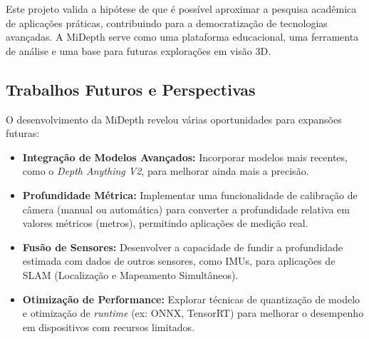 \documentclass{SBCbookchapter}
\newcommand{\nomeProjeto}{MiDepth }
\begin{document}
    Este projeto valida a hipótese de que é possível aproximar a pesquisa acadêmica de aplicações práticas, contribuindo para a democratização de tecnologias avançadas. A \nomeProjeto serve como uma plataforma educacional, uma ferramenta de análise e uma base para futuras explorações em visão 3D.

    \subsection{Trabalhos Futuros e Perspectivas}
    O desenvolvimento da \nomeProjeto revelou várias oportunidades para expansões futuras:
    \begin{itemize}
        \item \textbf{Integração de Modelos Avançados:} Incorporar modelos mais recentes, como o \textit{Depth Anything V2}, para melhorar ainda mais a precisão.
        \item \textbf{Profundidade Métrica:} Implementar uma funcionalidade de calibração de câmera (manual ou automática) para converter a profundidade relativa em valores métricos (metros), permitindo aplicações de medição real.
        \item \textbf{Fusão de Sensores:} Desenvolver a capacidade de fundir a profundidade estimada com dados de outros sensores, como IMUs, para aplicações de SLAM (Localização e Mapeamento Simultâneos).
        \item \textbf{Otimização de Performance:} Explorar técnicas de quantização de modelo e otimização de \textit{runtime} (ex: ONNX, TensorRT) para melhorar o desempenho em dispositivos com recursos limitados.
    \end{itemize}
\end{document}
